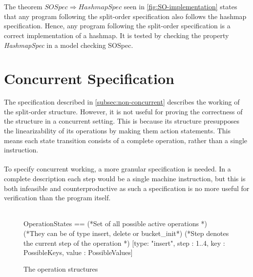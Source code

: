 \documentclass{uit-thesis}
\begin{document}
\\\\
The theorem $SOSpec \Rightarrow HashmapSpec$ seen in \autoref{fig:SO-implementation} states that any program following the split-order specification also follows the hashmap specification. Hence, any program following the split-order specification is a correct implementation of a hashmap. It is tested by checking the property \textit{HashmapSpec} in a model checking SOSpec.

\section{Concurrent Specification}
The specification described in \autoref{subsec:non-concurrent} describes the working of the split-order structure. However, it is not useful for proving the correctness of the structure in a concurrent setting. This is because its structure presupposes the linearizability of its operations by making them action statements. This means each state transition consists of a complete operation, rather than a single instruction.
\\\\
To specify concurrent working, a more granular specification is needed. In a complete description each step would be a single machine instruction, but this is both infeasible and counterproductive as such a specification is no more useful for verification than the program itself.
\\\\
\begin{figure}
    \begin{tla}
OperationStates ==
    (*Set of all possible active operations            *)
    (*They can be of type insert, delete or bucket\_init*)
    (*Step denotes the current step of the operation   *)
    [type: {"insert"}, step : 1..4, key : PossibleKeys, value : PossibleValues]
    \end{tla}
\begin{tlatex}
%
%
%
\@xx{}%
%
%
\@xx{}%
%
%
\@xx{}%
%
%
\end{tlatex}
    \caption{The operation structures}
    \label{fig:op-structure}
\end{figure}
\end{document}
